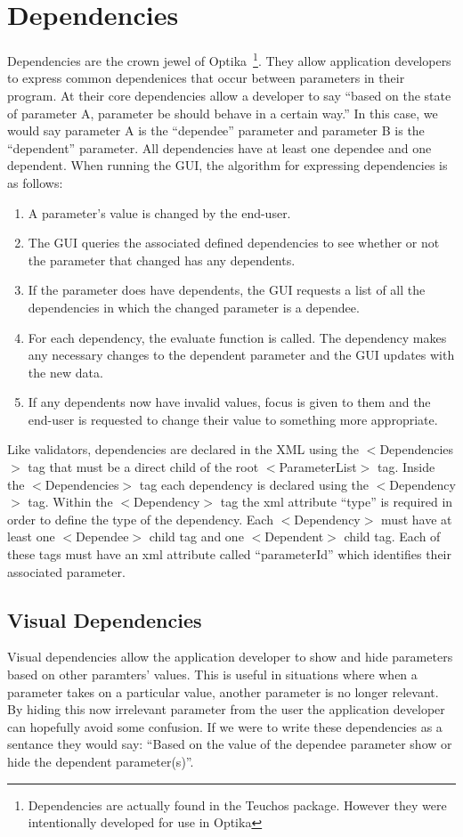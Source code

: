 \section{Dependencies}
Dependencies are the crown jewel of Optika~\footnote{Dependencies are actually found in the Teuchos package. However they were intentionally developed for use in Optika}.
They allow application developers to express common dependenices that occur between
parameters in their program. At their core dependencies allow a developer to say ``based on the state of parameter A, parameter be should
behave in a certain way.'' In this case, we would say parameter A is the ``dependee'' parameter and parameter B is the ``dependent'' parameter.
All dependencies have at least one dependee and one dependent. When running the GUI, the algorithm for expressing dependencies is as follows:
\begin{enumerate}
	\item A parameter's value is changed by the end-user.
	\item The GUI queries the associated defined dependencies to see whether or not the parameter that changed has any dependents.
	\item If the parameter does have dependents, the GUI requests a list of all the dependencies in which the changed
	parameter is a dependee.
	\item For each dependency, the evaluate function is called. The dependency makes any necessary changes to the dependent parameter
	and the GUI updates with the new data.
	\item If any dependents now have invalid values, focus is given to them and the end-user is requested to change their value to
	something more appropriate.
\end{enumerate}
Like validators, dependencies are declared in the XML using the $<$Dependencies$>$ tag that must be a direct child
of the root $<$ParameterList$>$ tag. Inside the $<$Dependencies$>$ tag each dependency is declared using the $<$Dependency$>$ tag. Within the
$<$Dependency$>$ tag the xml attribute ``type'' is required in order to define the type of the dependency. Each $<$Dependency$>$ must have at least
one $<$Dependee$>$ child tag and one $<$Dependent$>$ child tag. Each of these tags must have an xml attribute called ``parameterId'' which identifies
their associated parameter.

\subsection{Visual Dependencies}
Visual dependencies allow the application developer to show and hide parameters based on other paramters' values. This is useful in situations where
when a parameter takes on a particular value, another parameter is no longer relevant. By hiding this now irrelevant parameter from the user the
application developer can hopefully avoid some confusion. If we were to write these dependencies as a sentance they would say: ``Based on
the value of the dependee parameter show or hide the dependent parameter(s)''.

